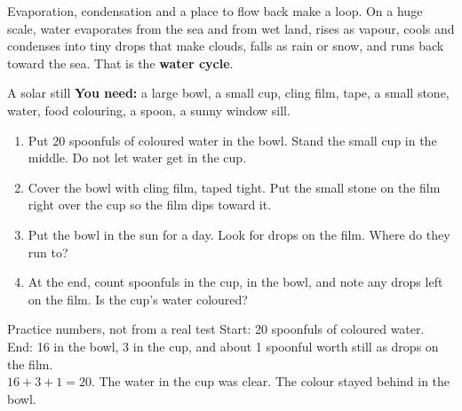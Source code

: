 \label{ch5}

Evaporation, condensation and a place to flow back make a loop. On a huge scale, water evaporates from the sea and from wet land, rises as vapour, cools and condenses into tiny drops that make clouds, falls as rain or snow, and runs back toward the sea. That is the \textbf{water cycle}.

\begin{center}
\end{center}

\begin{tryit}{A solar still}
\textbf{You need:} a large bowl, a small cup, cling film, tape, a small stone, water, food colouring, a spoon, a sunny window sill.
\begin{enumerate}[leftmargin=1.6em]
\item Put 20 spoonfuls of coloured water in the bowl. Stand the small cup in the middle. Do not let water get in the cup.
\item Cover the bowl with cling film, taped tight. Put the small stone on the film right over the cup so the film dips toward it.
\item Put the bowl in the sun for a day. Look for drops on the film. Where do they run to?
\item At the end, count spoonfuls in the cup, in the bowl, and note any drops left on the film. Is the cup's water coloured?
\end{enumerate}
\end{tryit}

\begin{worked}{Practice numbers, not from a real test}
Start: 20 spoonfuls of coloured water.\\
End: 16 in the bowl, 3 in the cup, and about 1 spoonful worth still as drops on the film.\\
$16+3+1=20$. The water in the cup was clear. The colour stayed behind in the bowl.
\end{worked}

